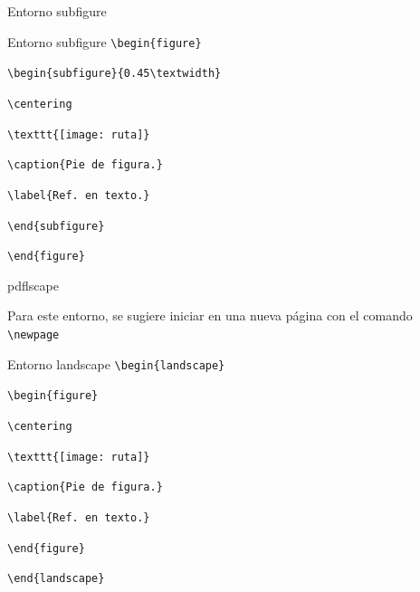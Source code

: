\documentclass[aspectratio=169, 10pt]{beamer}
\begin{document}
\begin{frame}[fragile]{Entorno subfigure}

     
    \begin{exampleblock}{Entorno subfigure}
    \verb|\begin{figure}|
    
        \hspace{1cm}\verb|\begin{subfigure}{0.45\textwidth}|
        
                \hspace{1.75cm}\verb|\centering|
                
                \hspace{1.75cm}\verb|\texttt{[image: ruta]}|

               \hspace{1.75cm} \verb|\caption{Pie de figura.}|
                
                \hspace{1.75cm}\verb|\label{Ref. en texto.}|
                
        \hspace{1cm}\verb|\end{subfigure}|

        \verb|\end{figure}|

    \end{exampleblock}    
    

\end{frame}

\begin{frame}[fragile]{pdflscape}

Para este entorno, se sugiere iniciar en una nueva página con el comando \verb|\newpage|
        \begin{exampleblock}{Entorno landscape}
        \verb|\begin{landscape}|
        
        \hspace{1cm}\verb|\begin{figure}|
        
                \hspace{1.75cm}\verb|\centering|

                \hspace{1.75cm}\verb|\texttt{[image: ruta]}|
                
               \hspace{1.75cm} \verb|\caption{Pie de figura.}|
                
               \hspace{1.75cm} \verb|\label{Ref. en texto.}|
                
        \hspace{1cm}\verb|\end{figure}|
        
        \verb|\end{landscape}|
    \end{exampleblock}    
\end{frame}
\end{document}
